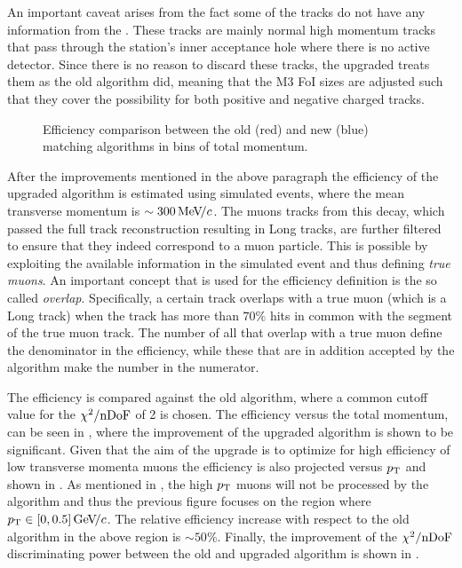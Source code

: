 An important caveat arises from the fact some of the \veloTTracks tracks do not have any information from
the \ttracker. These tracks are mainly normal high momentum tracks that pass through the \ttracker station's inner
acceptance hole where there is no active detector. Since there is no reason to discard these tracks, the upgraded
\mvTTm treats them as the old \mvm algorithm did, meaning that the M3 FoI sizes are adjusted such that they cover
the possibility for both positive and negative charged tracks.

\begin{figure}[t]
  \centering
    \scalebox{.6}{}
  \caption{Efficiency comparison between the old (red) and new (blue) matching algorithms in bins of total momentum.}
 \label{mvm_eff_p_comp}
\end{figure}

After the improvements mentioned in the above paragraph the efficiency of the upgraded \mvTTm algorithm
is estimated using simulated \Sigmapmumu events, where the mean transverse momentum is $\sim 300{\mathrm{\,Me\kern -0.1em V\!/}c}$.
The muons tracks from this decay, which passed the full track reconstruction resulting in Long tracks,
are further filtered to ensure that they indeed correspond to a muon particle. This is possible by
exploiting the available information in the simulated event and thus defining {\it true muons}.
An important concept that is used for the \mvTTm efficiency definition is the so called {\it overlap}.
Specifically, a certain \velo track overlaps with a true muon (which is a Long track)
when the \velo track has more than $70\%$ \velo hits in common with the \velo segment
of the true muon track. The number of all \veloTTracks that overlap with a true muon define the
denominator in the \mvTTm efficiency, while these \veloTTracks that are in addition accepted by
the \mvTTm algorithm make the number in the numerator.

The efficiency is compared against the old
\mvm algorithm, where a common cutoff value for the $\chi^2/\rm nDoF$ of 2 is chosen. The efficiency
versus the total momentum, can be seen in , where the improvement of the
upgraded \mvTTm algorithm is shown to be significant.  Given that the aim of the \mvTTm upgrade
is to optimize for high efficiency of low transverse momenta muons the efficiency is also projected
versus $\mbox{$p_{\rm T}$}$ and shown in . As mentioned in , the
high $\mbox{$p_{\rm T}$}$ muons will not be processed by the \mvTTm algorithm and thus the previous figure focuses on
the region where $\mbox{$p_{\rm T}$}\in[0,0.5]{\mathrm{\,Ge\kern -0.1em V\!/}c}$. The relative efficiency increase with respect to the old
\mvm algorithm in the above region is $\sim 50\%$. Finally, the improvement of the $\chi^2/\rm nDoF$
discriminating power between the old and upgraded algorithm is shown in .

